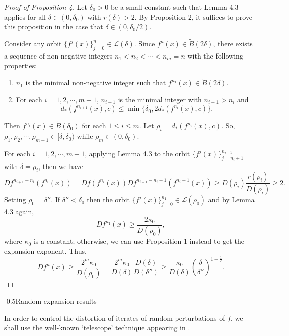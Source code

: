 \documentclass[11pt,oneside]{article}
\makeatletter
\theoremstyle{plain}
\numberwithin{equation}{section}
\numberwithin{figure}{section}
\numberwithin{table}{section}
\renewcommand{\subsection}{\@startsection{subsection}{1}{0mm}
{-\baselineskip}{0.5\baselineskip}{\large\bf\leftline}}
\makeatother
\begin{document}
\begin{proof}[Proof of Proposition 4]

Let $\delta_0 > 0$ be a small constant such that Lemma 4.3 applies for all $\delta \in (0, \delta_0)$ with $r(\delta) > 2$. By Proposition 2, it suffices to prove this proposition in the case that $\delta \in (0, \delta_0/2)$.


Consider any orbit $\{f^j(x) \}_{j=0}^n \in \mathcal L(\delta)$. Since $f^n(x) \in \tilde B(2 \delta)$, there exists a sequence of non-negative integers $n_1 < n_2 < \cdots < n_m =n$ with the following properties:
\begin{enumerate}
\item $n_1$ is the minimal non-negative integer such that $f^{n_1}(x) \in \tilde B(2\delta)$. 
\item For each $i = 1, 2, \cdots, m-1$, $n_{i+1}$ is the minimal integer with $n_{i+1} > n_i$ and 
\[
d_*(f^{n_{i+1}}(x), c) \leq \min\{ \delta_0, 2 d_*(f^{n_i}(x), c) \}.
\]
\end{enumerate}
Then $f^{n_i}(x) \in \tilde B(\delta_0)$ for each $1 \leq i \leq m$. Let $\rho_i = d_*(f^{n_i}(x), c)$. So, $\rho_1, \rho_2, \cdots, \rho_{m-1} \in [\delta, \delta_0)$ while $\rho_m \in (0, \delta_0)$.


For each $i=1, 2, \cdots, m-1$, applying Lemma 4.3 to the orbit $\{ f^j(x)\}_{j=n_i+1}^{n_{i+1}}$ with $\delta = \rho_i$, then we have
\[
Df^{n_{i+1} - n_i}(f^{n_i}(x)) = Df(f^{n_i}(x)) Df^{n_{i+1} - n_i -1}(f^{n_i+1}(x)) \geq D(\rho_i) \frac{r(\rho_i)}{D(\rho_i)} \geq 2.
\]
Setting $\rho_0 = \delta''$. If $\delta'' < \delta_0$ then the orbit $\{ f^j(x) \}_{j=0}^{n_1} \in \mathcal L(\rho_0)$ and by Lemma 4.3 again, 
\[
Df^{n_1}(x) \geq \frac{2 \kappa_0}{D(\rho_0)},
\]
where $\kappa_0$ is a constant; otherwise, we can use Proposition 1 instead to get the expansion exponent. Thus,
\[
Df^n(x) \geq \frac{2^m \kappa_0}{D(\rho_0)} = \frac{2^m \kappa_0}{D(\delta)} \frac{D(\delta)}{D(\delta'')} \geq \frac{\kappa_0}{D(\delta)} \left(\frac{\delta}{\delta''} \right)^{1 - \frac{1}{\ell}}.
\] 

\end{proof}
\fi



\subsection{Random expansion results}



In order to control the distortion of iterates of random perturbations of $f$, we shall use the well-known `telescope' technique appearing in \cite{BC, Ts}. 
\end{document}
